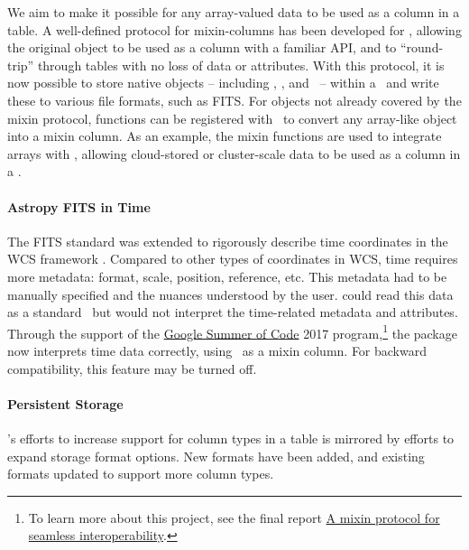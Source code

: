 \documentclass[modern]{aastex631}
\begin{document}
We aim to make it possible for any array-valued data to be used as a column in a
table. A well-defined protocol for mixin-columns has been developed for
\astropytable, allowing the original object to be used as a column with a
familiar API, and to ``round-trip'' through tables with no loss of data or
attributes. With this protocol, it is now possible to store \astropy native
objects -- including \astropyTime, \astropyQuantity, and \astropySkyCoord\ --
within a \astropyTable\ and write these to various file formats, such as FITS.
For objects not already covered by the mixin protocol, functions can be
registered with \astropyTable\ to convert any array-like object into a mixin
column. As an example, the mixin functions are used to integrate 
arrays with \astropyTable, allowing cloud-stored or cluster-scale data to be
used as a column in a \astropyTable.

\paragraph{Astropy FITS in Time}

The FITS standard was extended to rigorously describe time coordinates in the
WCS framework \citep{FITS-Time:2015}. Compared to
other types of coordinates in WCS, time requires more metadata: format, scale,
position, reference, etc. This metadata had to be manually specified and the
nuances understood by the user. \astropyfits could read this data as a standard
\astropyFitsColumn\, but would not interpret the time-related metadata and
attributes. Through the support of the
\href{https://summerofcode.withgoogle.com/archive/2017/projects/4778482366152704}{Google
Summer of Code} 2017 program,\footnote{To learn more about this project,
see the final report
\href{https://aaryapatil.wordpress.com/2017/08/28/a-mixin-protocol-for-seamless-interoperability/}{A
mixin protocol for seamless interoperability}.} the \astropyfits package now
interprets time data correctly, using \astropyTime\ as a mixin column. For
backward compatibility, this feature may be turned off.

\paragraph{Persistent Storage}

\astropy's efforts to increase support for column types in a table is mirrored
by efforts to expand storage format options. New formats have been added, and
existing formats updated to support more column types.
\end{document}
